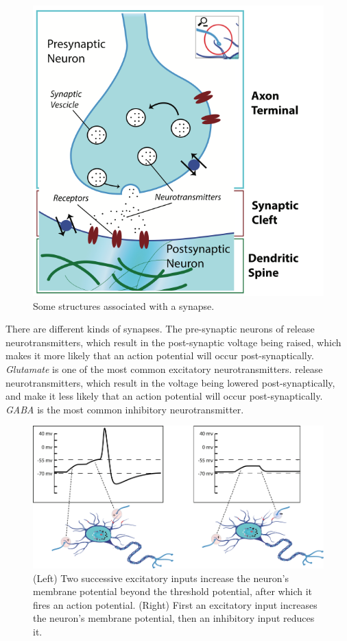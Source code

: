 \begin{figure}[h]
\centering
\includegraphics[width=.45\textwidth]{./images/synaptic_cleft.png}
\caption[Pamela Payne.]{Some structures associated with a synapse.}
\label{f:synapse}
\end{figure}

There are different kinds of synapses. The pre-synaptic neurons of   release neurotransmitters, which result in the  post-synaptic voltage being raised, which makes it more likely that an action potential will occur post-synaptically. \emph{Glutamate} is one of the most common excitatory neurotransmitters.  release neurotransmitters, which result in the voltage being lowered post-synaptically, and make it less likely that an action potential will occur post-synaptically. \emph{GABA} is the most common  inhibitory neurotransmitter.

\begin{figure}[h]
\centering
\includegraphics[scale=1.5]{./images/membranePotential3.png}
\caption[Adapted from original work by Pamela Payne.]{(Left) Two successive excitatory inputs increase the neuron's membrane potential beyond the threshold potential, after which it fires an action potential. (Right) First an excitatory input increases the neuron's membrane potential, then an inhibitory input reduces it. }
\label{membranePotential}
\end{figure}

